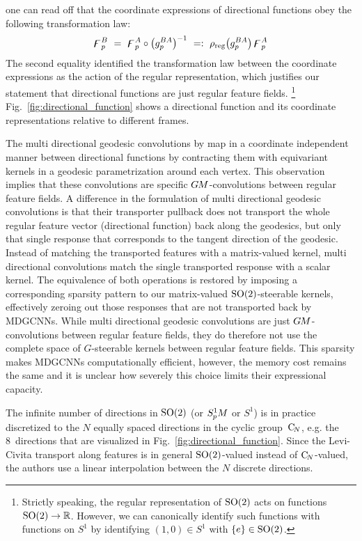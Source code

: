 one can read off that the coordinate expressions of directional functions obey the following transformation law:
\begin{align}
    \digamma_p^B\ =\ \digamma_p^A \circ \big(g_p^{BA}\big)^{-1}\ =:\ \rho_\textup{reg}\big( g_p^{BA}\big)\, \digamma_p^A
\end{align}
The second equality identified the transformation law between the coordinate expressions as the action of the regular representation, which justifies our statement that directional functions are just regular feature fields.%
\footnote{
    Strictly speaking, the regular representation of $\operatorname{SO}(2)$ acts on functions $\operatorname{SO}(2) \to \mathbb{R}$.
    However, we can canonically identify such functions with functions on $S^1$ by identifying $(1,0)\in S^1$ with $\{e\}\in\operatorname{SO}(2)$.
}
Fig.~\ref{fig:directional_function} shows a directional function and its coordinate representations relative to different frames.

The multi directional geodesic convolutions by \citet{poulenard2018multi} map in a coordinate independent manner between directional functions by contracting them with equivariant kernels in a geodesic parametrization around each vertex.
This observation implies that these convolutions are specific $G\mkern-1.4muM$-convolutions between regular feature fields.
A difference in the formulation of multi directional geodesic convolutions is that their transporter pullback does not transport the whole regular feature vector (directional function) back along the geodesics, but only that single response that corresponds to the tangent direction of the geodesic.
Instead of matching the transported features with a matrix-valued kernel, multi directional convolutions match the single transported response with a scalar kernel.
The equivalence of both operations is restored by imposing a corresponding sparsity pattern to our matrix-valued $\operatorname{SO}(2)$-steerable kernels, effectively zeroing out those responses that are not transported back by MDGCNNs.
While multi directional geodesic convolutions are just $G\mkern-1.4muM$-convolutions between regular feature fields, they do therefore not use the complete space of $G$-steerable kernels between regular feature fields.
This sparsity makes MDGCNNs computationally efficient, however, the memory cost remains the same and it is unclear how severely this choice limits their expressional capacity.

The infinite number of directions in $\operatorname{SO}(2)$ (or $S^1_{\mkern-.5mu p}\mkern-.5muM$ or $S^1$) is in practice discretized to the $N$ equally spaced directions in the cyclic group~$\operatorname{C}_{\!N}$, e.g. the 8~directions that are visualized in Fig.~\ref{fig:directional_function}.
Since the Levi-Civita transport along features is in general $\operatorname{SO}(2)$-valued instead of $\operatorname{C}_{\!N}$-valued, the authors use a linear interpolation between the $N$ discrete directions.

